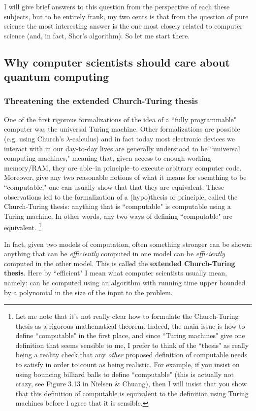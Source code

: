 \documentclass{article}
\begin{document}
I will give brief answers to this question from the perspective of each these subjects, but to be entirely frank, my two cents is that from the question of pure science the most interesting answer is the one most closely related to computer science (and, in fact, Shor's algorithm).  So let me start there.

\subsection{Why computer scientists should care about quantum computing}
\subsubsection{Threatening the extended Church-Turing thesis}
One of the first rigorous formalizations of the idea of a ``fully programmable" computer was the universal Turing machine.  Other formalizations are possible (e.g. using Church's $\lambda$-calculus) and in fact today most electronic devices we interact with in our day-to-day lives are generally understood to be ``universal computing machines," meaning that, given access to enough working memory/RAM, they are able--in principle--to execute arbitrary computer code.  Moreover, give any two reasonable notions of what it means for soemthing to be ``computable," one can usually show that that they are equivalent.  These observations led to the formalization of a (hypo)thesis or principle, called the Church-Turing thesis: anything that is ``computable" is computable using a Turing machine.  In other words, any two ways of defining ``computable" are equivalent.
\footnote{Let me note that it's not really clear how to formulate the Church-Turing thesis as a rigorous mathematical theorem.  Indeed, the main issue is how to define ``computable" in the first place, and since ``Turing machines" give one definition that seems sensible to me, I prefer to think of the ``thesis" as really being a reality check that any \emph{other} proposed definition of computable needs to satisfy in order to count as being realistic.  For example, if you insist on using bouncing billiard balls to define ``computable" (this is actually not crazy, see Figure 3.13 in Nielsen \& Chuang), then I will insist that you show that this definition of computable is equivalent to the definition using Turing machines before I agree that it is sensible.} 

In fact, given two models of computation, often something stronger can be shown: anything that can be \emph{efficiently} computed in one model can be \emph{efficiently} computed in the other model.  This is called the {\bf extended Church-Turing thesis}.  Here by ``efficient" I mean what computer scientists usually mean, namely: can be computed using an algorithm with running time upper bounded by a polynomial in the size of the input to the problem.
\end{document}
